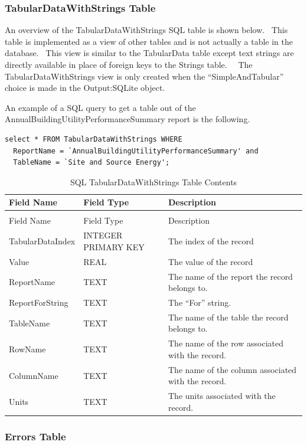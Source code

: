 \subsubsection{TabularDataWithStrings Table}

An overview of the TabularDataWithStrings SQL table is shown below.  This table is implemented as a view of other tables and is not actually a table in the database.  This view is similar to the TabularData table except text strings are directly available in place of foreign keys to the Strings table.   The TabularDataWithStrings view is only created when the “SimpleAndTabular” choice is made in the Output:SQLite object.

An example of a SQL query to get a table out of the AnnualBuildingUtilityPerformanceSummary report is the following.

\begin{lstlisting}
select * FROM TabularDataWithStrings WHERE
  ReportName = `AnnualBuildingUtilityPerformanceSummary' and
  TableName = `Site and Source Energy';
\end{lstlisting}

\begin{longtable}[c]{>{\raggedright}p{1.5in}>{\raggedright}p{1.5in}>{\raggedright}p{3in}}
\caption{SQL TabularDataWithStrings Table Contents \label{table:table-41.-sql-tabulardatawithstrings-table}} \tabularnewline
\toprule
Field Name & Field Type & Description \tabularnewline
\midrule
\endfirsthead

\caption[]{SQL TabularDataWithStrings Table Contents} \tabularnewline
\toprule
Field Name & Field Type & Description \tabularnewline
\midrule
\endhead

TabularData\-Index & INTEGER PRIMARY KEY & The index of the record \tabularnewline
Value & REAL & The value of the record \tabularnewline
ReportName & TEXT & The name of the report the record belongs to. \tabularnewline
ReportFor\-String & TEXT & The “For” string. \tabularnewline
TableName & TEXT & The name of the table the record belongs to. \tabularnewline
RowName & TEXT & The name of the row associated with the record. \tabularnewline
ColumnName & TEXT & The name of the column associated with the record. \tabularnewline
Units & TEXT & The units associated with the record. \tabularnewline
\bottomrule
\end{longtable}

\subsubsection{Errors Table}\label{errors-table}

